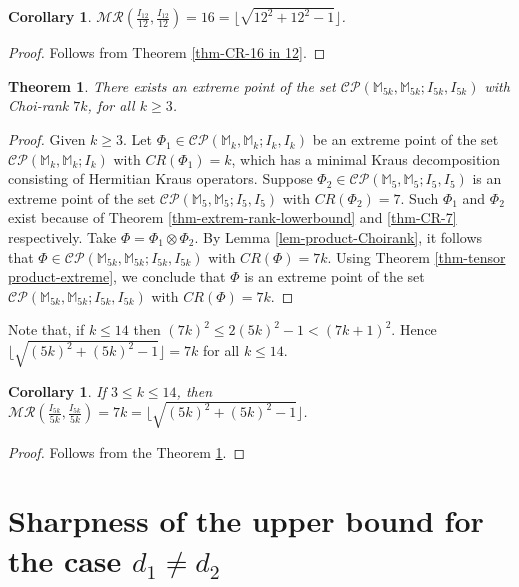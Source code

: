 \documentclass[10pt,reqno]{amsart}
\theoremstyle{definition}
\theoremstyle{plain}
\newtheorem{thm}[defn]{Theorem}
\newtheorem{cor}[defn]{Corollary}
\theoremstyle{remark}
\newcommand{\mbb}[1]{\mathbb{#1}}
\newcommand{\msc}[1]{\mathscr{#1}}
\newcommand{\M}[1]{\mbb{M}_{#1}}%
\numberwithin{equation}{section}%
\begin{document}
\begin{cor}
	$\msc{MR}(\frac{I_{12}}{12},\frac{I_{12}}{12})= 16=\lfloor{\sqrt{12^2+12^2-1}}\rfloor$.
\end{cor}


\begin{proof}
	Follows from Theorem \ref{thm-CR-16 in 12}.
\end{proof}



\begin{thm}\label{thm-CR-7k in 5k}
	There exists an extreme point of the set $\msc{CP}(\M{5k},\M{5k};I_{5k},I_{5k})$ with Choi-rank $7k$, for all $k\geq 3$.
\end{thm}


\begin{proof}
	Given $k\geq 3$. Let $\Phi_1\in\msc{CP}(\M{k},\M{k};I_{k},I_{k})$ be an extreme point of the set $\msc{CP}(\M{k},\M{k}; I_{k})$ with $CR(\Phi_1)=k$, which has a minimal Kraus decomposition consisting of Hermitian Kraus operators. Suppose $\Phi_2\in\msc{CP}(\M{5},\M{5}; I_{5},I_{5})$ is an extreme point of the set $\msc{CP}(\M{5},\M{5}; I_{5}, I_{5})$ with $CR(\Phi_2)=7$. Such $\Phi_1$ and $\Phi_2$ exist because of Theorem \ref{thm-extrem-rank-lowerbound} and \ref{thm-CR-7} respectively. Take $\Phi = \Phi_1 \otimes \Phi_2$. By Lemma \ref{lem-product-Choirank}, it follows that $\Phi\in\msc{CP}(\M{5k},\M{5k}; I_{5k}, I_{5k})$ with $CR(\Phi)=7k$. Using Theorem \ref{thm-tensor product-extreme}, we conclude that $\Phi$ is an extreme point of the set $\msc{CP}(\M{5k},\M{5k}; I_{5k}, I_{5k})$ with $CR(\Phi)=7k$.
\end{proof}


Note that, if $k\leq 14$ then $(7k)^2\leq 2(5k)^2-1< (7k+1)^2$. Hence $\lfloor{\sqrt{(5k)^2+(5k)^2-1}}\rfloor=7k$ for all $k\leq 14$.


\begin{cor}
	If $3\leq k\leq 14$, then $\msc{MR}(\frac{I_{5k}}{5k},\frac{I_{5k}}{5k})=7k=\lfloor{\sqrt{(5k)^2+(5k)^2-1}}\rfloor$. 
\end{cor}

\begin{proof}
	Follows from the Theorem \ref{thm-CR-7k in 5k}.
\end{proof}


\section{Sharpness of the upper bound for the case \texorpdfstring{$d_1\neq d_2$}{TEXT}}\label{section 5}
\end{document}
